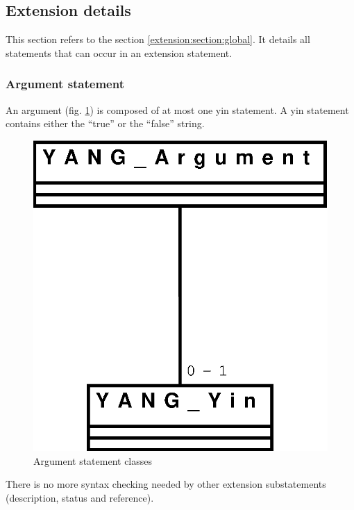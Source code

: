 \documentclass[a4paper]{article}
\begin{document}
\subsection{Extension details}
\label{extension:section:detail}

This section refers  to the section \ref{extension:section:global}. It
details all statements that can occur in an extension statement.

\subsubsection{Argument statement}

An  argument (fig.   \ref{argument}) is  composed of  at most  one yin
statement.  A  yin  statement  contains  either the  ``true''  or  the
``false'' string.
\begin{figure}[htbp]
\begin{center}
\includegraphics[scale = .3]{argument.eps}
\end{center}
\caption{Argument statement classes}
\label{argument}
\end{figure}

There is no more syntax checking needed by other extension
substatements (description, status and reference).
\end{document}
